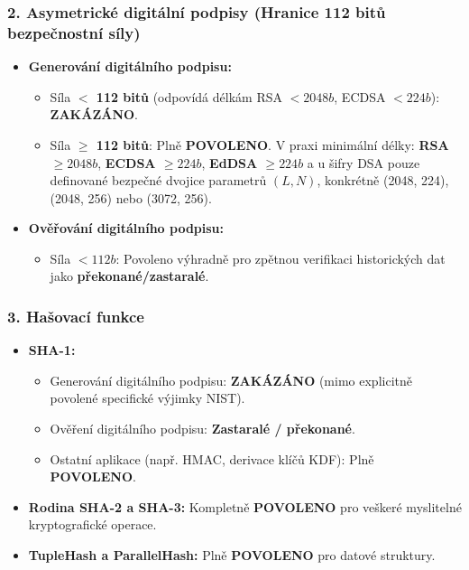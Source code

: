 \documentclass[10pt,a4paper]{article}
\begin{document}
	\subsubsection*{2. Asymetrické digitální podpisy (Hranice 112 bitů bezpečnostní síly)}
	\begin{itemize}
		\item \textbf{Generování digitálního podpisu:}
		\begin{itemize}
			\item Síla \textbf{$<$ 112 bitů} (odpovídá délkám RSA $< 2048b$, ECDSA $< 224b$): \textbf{ZAKÁZÁNO}.
			\item Síla \textbf{$\ge$ 112 bitů}: Plně \textbf{POVOLENO}. V praxi minimální délky: \textbf{RSA $\ge 2048b$}, \textbf{ECDSA $\ge 224b$}, \textbf{EdDSA $\ge 224b$} a u šifry DSA pouze definované bezpečné dvojice parametrů $(L,N)$, konkrétně (2048, 224), (2048, 256) nebo (3072, 256).
		\end{itemize}
		\item \textbf{Ověřování digitálního podpisu:}
		\begin{itemize}
			\item Síla \textbf{$< 112b$}: Povoleno výhradně pro zpětnou verifikaci historických dat jako \textbf{překonané/zastaralé}.
		\end{itemize}
	\end{itemize}
	
	\subsubsection*{3. Hašovací funkce}
	\begin{itemize}
		\item \textbf{SHA-1:} 
		\begin{itemize}
			\item Generování digitálního podpisu: \textbf{ZAKÁZÁNO} (mimo explicitně povolené specifické výjimky NIST).
			\item Ověření digitálního podpisu: \textbf{Zastaralé / překonané}.
			\item Ostatní aplikace (např. HMAC, derivace klíčů KDF): Plně \textbf{POVOLENO}.
		\end{itemize}
		\item \textbf{Rodina SHA-2 a SHA-3:} Kompletně \textbf{POVOLENO} pro veškeré myslitelné kryptografické operace.
		\item \textbf{TupleHash a ParallelHash:} Plně \textbf{POVOLENO} pro datové struktury.
	\end{itemize}
	
\end{document}
